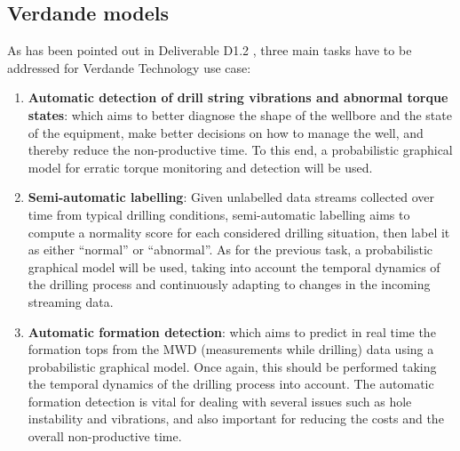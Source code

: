 
\subsection{Verdande models} \label{Section:VerdandeModels}

As has been pointed out in Deliverable D1.2 \cite{Fer14b}, three main tasks have to be addressed for Verdande Technology use case:

\begin{enumerate}
\item \textbf{Automatic detection of drill string vibrations and abnormal torque states}: which aims to better diagnose the shape of the wellbore and the state of the equipment, make better decisions on how to manage the well, and thereby reduce the non-productive time. To this end, a probabilistic graphical model for erratic torque monitoring and detection will be used.

\item \textbf{Semi-automatic labelling}: Given unlabelled data streams collected over time from typical drilling conditions, semi-automatic labelling aims to compute a normality score for each considered drilling situation, then label it as either ``normal'' or ``abnormal''. As for the previous task, a probabilistic graphical model will be used, taking into account the temporal dynamics of the drilling process and continuously adapting to changes in the incoming streaming data. 

\item \textbf{Automatic formation detection}: which aims to predict in real time the formation tops from the MWD (measurements while drilling) data using a probabilistic graphical model. Once again, this should be performed taking the temporal dynamics of the drilling process into account. The automatic formation detection is vital for dealing with several issues such as hole instability and vibrations, and also important for reducing the costs and the overall non-productive time.
\end{enumerate}

